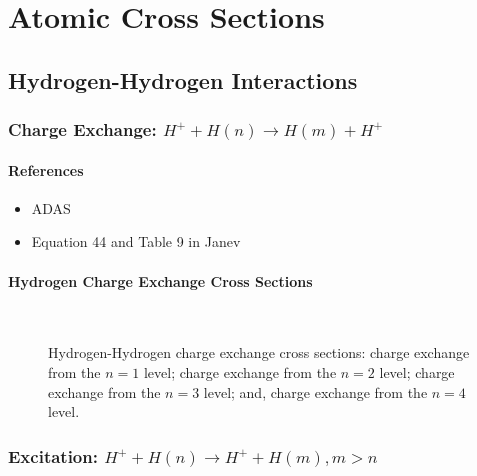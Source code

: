 \chapter{Atomic Cross Sections}\label{app:cross_sections}
\newpage
\section{Hydrogen-Hydrogen Interactions}
\subsection{Charge Exchange: $H^+ + H(n) \rightarrow H(m) + H^+$}
\subsubsection{References}
\begin{itemize}
    \item ADAS\cite{adas}
    \item Equation 44 and Table 9 in Janev\cite{janev2003collision}
\end{itemize}
\subsubsection{Hydrogen Charge Exchange Cross Sections}
\begin{figure}[h!]%
    \centering
    \hspace{8pt}
     \\
    \hspace{8pt}
    \caption{Hydrogen-Hydrogen charge exchange cross sections:
         charge exchange from the $n=1$ level;
         charge exchange from the $n=2$ level;
         charge exchange from the $n=3$ level; and,
         charge exchange from the $n=4$ level.}
    \label{fig:H_H_CX}
\end{figure}
\newpage

\subsection{Excitation: $H^+ + H(n) \rightarrow H^+ + H(m), m > n$}
